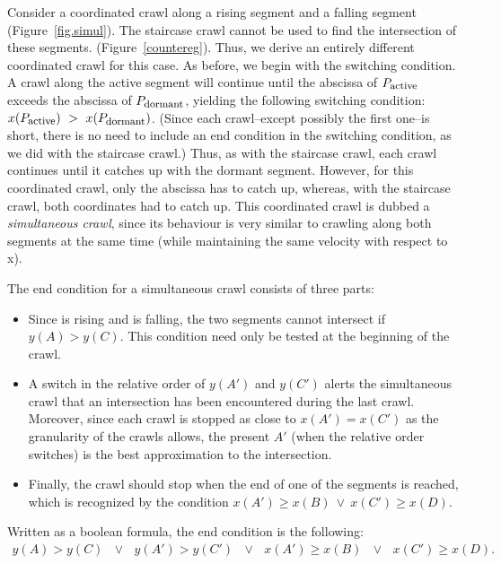 Consider a coordinated crawl along a rising segment  and a falling
segment  (Figure~\ref{fig.simul}).
The staircase crawl cannot be used to find the intersection of these
segments.
\ifFull(Figure~\ref{countereg}).\fi
Thus, we derive an entirely different coordinated crawl for this case.
As before, we begin with the switching condition.
A crawl along the active segment will continue until the abscissa of
$P_{\mbox{\footnotesize{active}}}$ exceeds the abscissa of 
$P_{\mbox{\footnotesize{dormant}}}$, yielding the following switching 
condition:
$x(P_{\mbox{\footnotesize{active}}})\ >\ x(P_{\mbox{\footnotesize{dormant}}})$.
(Since each crawl--except possibly the first one--is short,
there is no need to include an end condition in the switching condition,
as we did with the staircase crawl.)
Thus, as with the staircase crawl, each crawl continues until it catches
up with the dormant segment.
However, for this coordinated crawl, only the abscissa has to catch up,
whereas, with the staircase crawl, both coordinates had to catch up.
This coordinated crawl is dubbed a {\it simultaneous crawl},
since its behaviour is very similar to
crawling along both segments at the same time (while maintaining 
the same velocity with respect to x).

The end condition for a simultaneous crawl consists of three parts:
\begin{itemize}
\item 
	Since  is rising and  is falling,
	the two segments cannot intersect if $y(A) > y(C)$.
	This condition need only be tested at the beginning of the crawl.
\item
 A switch in the relative order of $y(A')$ and $y(C')$ 
 alerts the simultaneous crawl that an intersection has been encountered during
 the last crawl.
 Moreover, since each crawl is stopped as close to $x(A') = x(C')$ as the
 granularity of the crawls allows, the present $A'$ (when the relative order 
 switches) is the best approximation to the intersection.
\item
 Finally, the crawl should stop when the end of one of the segments is reached, 
 which is recognized by the condition 
 $x(A') \geq x(B)\ \vee \  x(C') \geq x(D)$.
\end{itemize}
Written as a boolean formula, the end condition is the following:
\begin{eqnarray*}
	y(A) > y(C)\ \ \ \vee \ \ \ y(A') > y(C')\ \ \ \vee \ \ \ 
	x(A') \geq x(B)\ \ \ \vee \ \ \ x(C') \geq x(D).
\end{eqnarray*}

